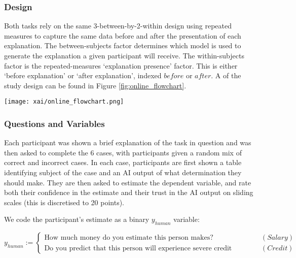 \subsubsection{Design}
Both tasks rely on the same 3-between-by-2-within design using repeated measures to capture the same data before and after the presentation of each explanation. The between-subjects factor determines which model is used to generate the explanation a given participant will receive. The within-subjects factor is the repeated-measures `explanation presence' factor. This is either `before explanation' or `after explanation', indexed $before$ or $after$. A of the study design can be found in Figure \ref{fig:online_flowchart}.

\begin{figure*}[htbp]
    \centering
    \texttt{[image: xai/online\_flowchart.png]}
    \caption{Participants in the online study are sorted into six buckets, where each bucket is segregated by explanatory condition and task and shown a brief description of the task (i.e., each participant sees only one of the explanations in Figure \ref{fig:online_explanations}). Then, each participant is shown 6 cases. In each case, participants are shown an applicant profile and a AI output. Participants are asked to agree or disagree with the AI output. Then, participants are given explanations based on their explanatory condition scores. They are then asked again to agree or disagree with the AI output.}
    \label{fig:online_flowchart}
\end{figure*}

\subsubsection{Questions and Variables}\label{sssec:q_and_v}
Each participant was shown a brief explanation of the task in question and was then asked to complete the 6 cases, with participants given a random mix of correct and incorrect cases. In each case, participants are first shown a table identifying subject of the case and an AI output of what determination they should make. They are then asked to estimate the dependent variable, and rate both their confidence in the estimate and their trust in the AI output on sliding scales (this is discretised to 20 points).

We code the participant's estimate as a binary $y_{human}$ variable:

\begin{equation}
    y_{human} := \begin{cases}
        \text{How much money do you estimate this person makes?} & (Salary) \\
        \text{Do you predict that this person will experience severe credit delinquency?} & (Credit)
    \end{cases}
\end{equation}

